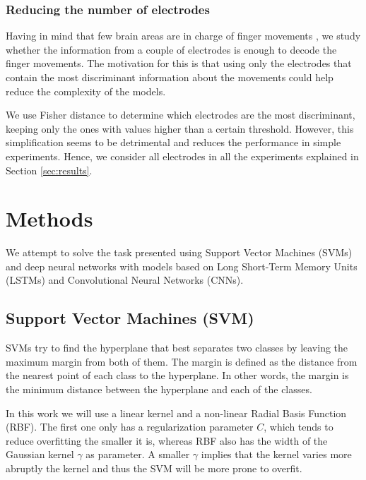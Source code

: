 \documentclass[10pt,conference,compsocconf]{IEEEtran}
\begin{document}
    \subsubsection{Reducing the number of electrodes}
    Having in mind that few brain areas are in charge of finger movements \cite{electrode}, we study whether the information from a couple of electrodes is enough to decode the finger movements. The motivation for this is that using only the electrodes that contain the most discriminant information about the movements could help reduce  the complexity of the models.
    
    We use Fisher distance to determine which electrodes are the most discriminant, keeping only the ones with values higher than a certain threshold. However, this simplification seems to be detrimental and reduces the performance in simple experiments. Hence, we consider all  electrodes in all the experiments explained in Section \ref{sec:results}.

\section{Methods} %
\label{sec:methods}
We attempt to solve the task presented using Support Vector Machines (SVMs) and deep neural networks with models based on Long Short-Term Memory Units (LSTMs) and Convolutional Neural Networks (CNNs).


\subsection{Support Vector Machines (SVM)}
\label{ssec:methods_SVMs}
SVMs try to find the hyperplane that best separates two classes by leaving the maximum margin from both of them. The margin is defined as the distance from the nearest point of each class to the hyperplane. In other words, the margin is the minimum distance between the hyperplane and each of the classes. 
 
 
 In this work we will use a linear kernel and a non-linear Radial Basis Function (RBF). The first one only has a regularization parameter $C$, which tends to reduce overfitting the smaller it is, whereas RBF also has the width of the Gaussian kernel $\gamma$ as parameter. A smaller $\gamma$ implies that the kernel varies more abruptly the kernel and thus the SVM will be more prone to overfit.
 
\end{document}
